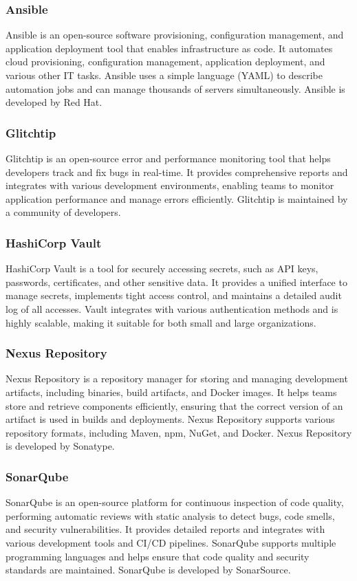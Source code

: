 \subsubsection{Ansible}
Ansible is an open-source software provisioning, configuration management, and application deployment tool that enables infrastructure as code. It automates cloud provisioning, configuration management, application deployment, and various other IT tasks. Ansible uses a simple language (YAML) to describe automation jobs and can manage thousands of servers simultaneously. Ansible is developed by Red Hat.

\subsubsection{Glitchtip}
Glitchtip is an open-source error and performance monitoring tool that helps developers track and fix bugs in real-time. It provides comprehensive reports and integrates with various development environments, enabling teams to monitor application performance and manage errors efficiently. Glitchtip is maintained by a community of developers.

\subsubsection{HashiCorp Vault}
HashiCorp Vault is a tool for securely accessing secrets, such as API keys, passwords, certificates, and other sensitive data. It provides a unified interface to manage secrets, implements tight access control, and maintains a detailed audit log of all accesses. Vault integrates with various authentication methods and is highly scalable, making it suitable for both small and large organizations.

\subsubsection{Nexus Repository}
Nexus Repository is a repository manager for storing and managing development artifacts, including binaries, build artifacts, and Docker images. It helps teams store and retrieve components efficiently, ensuring that the correct version of an artifact is used in builds and deployments. Nexus Repository supports various repository formats, including Maven, npm, NuGet, and Docker. Nexus Repository is developed by Sonatype.

\subsubsection{SonarQube}
SonarQube is an open-source platform for continuous inspection of code quality, performing automatic reviews with static analysis to detect bugs, code smells, and security vulnerabilities. It provides detailed reports and integrates with various development tools and CI/CD pipelines. SonarQube supports multiple programming languages and helps ensure that code quality and security standards are maintained. SonarQube is developed by SonarSource.


